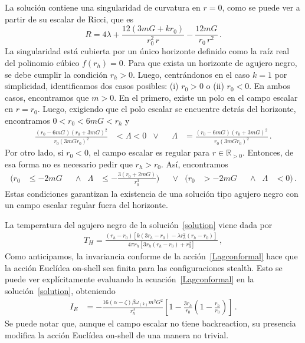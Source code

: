 \documentclass[../Main.tex]{subfiles}
\begin{document}
La solución contiene una singularidad de curvatura en $r=0$, como se puede ver a partir de su escalar de Ricci, que es
\begin{equation}
    R = 4\lambda + \frac{12(3mG+kr_0)}{r_0^2\,r} - \frac{12mG}{r_0\,r^2}\,.
\end{equation}
La singularidad está cubierta por un único horizonte definido como la raíz real del polinomio cúbico $f(r_h)=0$. Para que exista un horizonte de agujero negro, se debe cumplir la condición $r_h>0$. Luego, centrándonos en el caso $k=1$ por simplicidad, identificamos dos casos posibles: (i) $r_0>0$ o (ii) $r_0<0$. En ambos casos, encontramos que $m>0$. En el primero, existe un polo en el campo escalar en $r=r_0$. Luego, exigiendo que el polo escalar se encuentre detrás del horizonte, encontramos $0<r_0<6mG<r_h$ y
\begin{align}
    \frac{(r_0-6mG)(r_0+3mG)^2}{r_0(3 mGr_0)^2 }&<\Lambda <0 &\lor& & \Lambda &=\frac{(r_0-6mG)(r_0+3mG)^2}{r_0(3 mGr_0)^2}\,.
\end{align}
Por otro lado, si $r_0<0$, el campo escalar es regular para $r\in\mathbb{R}_{>0}$. Entonces, de esa forma no es necesario pedir que $r_h>r_0$. Así, encontramos 
\begin{align}
    \bigg(r_0&\leq -2mG& &\land& \Lambda &\leq-\frac{3(r_0+2mG)}{r_0^3}\bigg)& &\lor& \bigg(r_0&>-2mG & &\land&  \Lambda &<0\bigg)\,.
\end{align}
Estas condiciones garantizan la existencia de una solución tipo agujero negro con un campo escalar regular fuera del horizonte. 

La temperatura del agujero negro de la solución~\eqref{solution} viene dada por
\begin{align}\label{beta1}
 T_H = \frac{(r_h-r_0)\left[k(3r_h-r_0) - \lambda r_h^2(r_h-r_0)\right]}{4\pi r_h \left[ 3r_h(r_h-r_0)  +r_0^2\right]} \,,
\end{align} 
Como anticipamos, la invariancia conforme de la acción~\eqref{Lagconformal} hace que la acción Euclídea on-shell sea finita para las configuraciones stealth. Esto se puede ver explícitamente evaluando la ecuación~\eqref{Lagconformal} en la solución~\eqref{solution}, obteniendo
\begin{align}
I_E &= -\frac{16(\alpha-\zeta)\beta\omega_{(k)}m^2G^2}{r_h^3}\left[1-\frac{3r_h}{r_0}\left(1-\frac{r_h}{r_0}\right) \right]\, .
\end{align}
Se puede notar que, aunque el campo escalar no tiene backreaction, su presencia modifica la acción Euclídea on-shell de una manera no trivial. 
\end{document}
